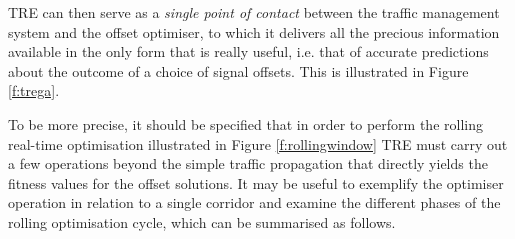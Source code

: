 TRE can then serve as a \emph{single point of contact} between the traffic management system and the offset optimiser, to which it delivers all the precious information available in the only form that is really useful, i.e. that of accurate predictions about the outcome of a choice of signal offsets. This is illustrated in Figure \ref{f:trega}.


To be more precise, it should be specified that in order to perform the rolling real-time optimisation illustrated in Figure \ref{f:rollingwindow} TRE must carry out a few operations beyond the simple traffic propagation that directly yields the fitness values for the offset solutions.
It may be useful to exemplify the optimiser operation in relation to a single corridor and examine the different phases of the rolling optimisation cycle, which can be summarised as follows.
